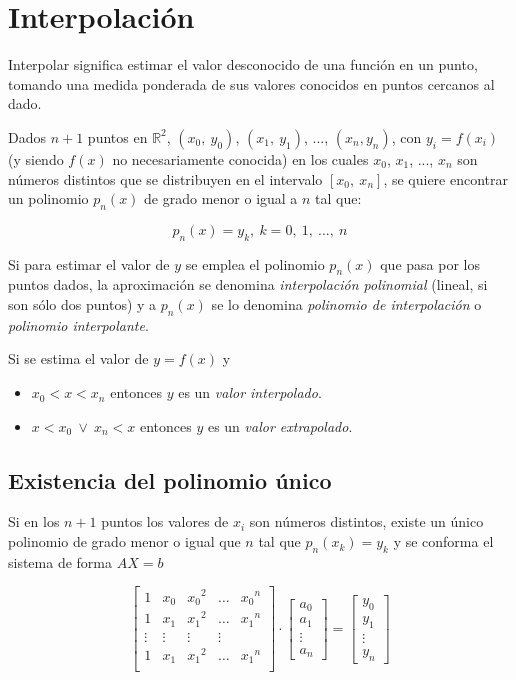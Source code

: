 \documentclass{article}
\begin{document}
\section{Interpolación}

Interpolar significa estimar el valor desconocido de una función en un punto,
tomando una medida ponderada de sus valores conocidos en puntos cercanos al 
dado.

Dados $n+1$ puntos en $\mathbb{R}^2$, $(x_0,\ y_0)$, $(x_1,\ y_1)$, ..., 
$(x_n, y_n)$, con $y_i = f(x_i)$ (y siendo $f(x)$ no necesariamente conocida) en
los cuales $x_0$, $x_1$, ..., $x_n$ son números distintos que se distribuyen en
el intervalo $\left[x_0,\ x_n\right]$, se quiere encontrar un polinomio $p_n(x)$
de grado menor o igual a $n$ tal que:

\[ p_n(x) = y_k,\ k=0,\ 1,\ ...,\ n\]

Si para estimar el valor de $y$ se emplea el polinomio $p_n(x)$ que pasa por los
puntos dados, la aproximación se denomina \emph{interpolación polinomial} 
(lineal, si son sólo dos puntos) y a $p_n(x)$ se lo denomina \emph{polinomio de
interpolación} o \emph{polinomio interpolante}.

Si se estima el valor de $y=f(x)$ y

\begin{itemize}
    \item $x_0<x<x_n$ entonces $y$ es un \emph{valor interpolado}.
    \item $x<x_0\ \lor\ x_n<x$ entonces $y$ es un \emph{valor extrapolado}.
\end{itemize}

\subsection{Existencia del polinomio único}

Si en los $n+1$ puntos los valores de $x_i$ son números distintos, existe un 
único polinomio de grado menor o igual que $n$ tal que $p_n(x_k) = y_k$ y se 
conforma el sistema de forma $AX=b$

\begin{equation*}
    \begin{bmatrix}
        1 & x_0 & {x_0}^2 & \dots & {x_0}^n \\
        1 & x_1 & {x_1}^2 & \dots & {x_1}^n \\
        \vdots & \vdots & \vdots & \vdots \\
        1 & x_1 & {x_1}^2 & \dots & {x_1}^n \\
    \end{bmatrix} \cdot
    \begin{bmatrix}
        a_0 \\
        a_1 \\
        \vdots \\
        a_n
    \end{bmatrix} = 
    \begin{bmatrix}
        y_0 \\
        y_1 \\
        \vdots \\
        y_n
    \end{bmatrix}
\end{equation*}
\end{document}
